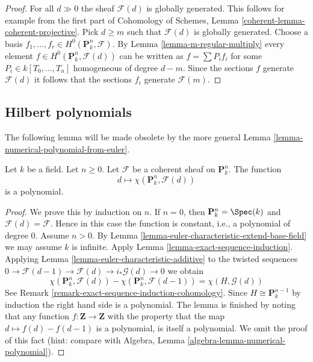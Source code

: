 \begin{proof}
For all $d \gg 0$ the sheaf $\mathcal{F}(d)$ is globally generated.
This follows for example from the first part of
Cohomology of Schemes, Lemma \ref{coherent-lemma-coherent-projective}.
Pick $d \geq m$ such that $\mathcal{F}(d)$ is globally generated.
Choose a basis $f_1, \ldots, f_r \in H^0(\mathbf{P}^n_k, \mathcal{F})$.
By Lemma \ref{lemma-m-regular-multiply} every element
$f \in H^0(\mathbf{P}^n_k, \mathcal{F}(d))$ can be written as
$f = \sum P_if_i$ for some $P_i \in k[T_0, \ldots, T_n]$ homogeneous
of degree $d - m$. Since the sections $f$ generate $\mathcal{F}(d)$
it follows that the sections $f_i$ generate $\mathcal{F}(m)$.
\end{proof}

\subsection{Hilbert polynomials}
\label{subsection-hilbert}

\noindent
The following lemma will be made obsolete by the more general
Lemma \ref{lemma-numerical-polynomial-from-euler}.

\begin{lemma}
\label{lemma-hilbert-polynomial}
Let $k$ be a field. Let $n \geq 0$. Let $\mathcal{F}$ be a coherent sheaf
on $\mathbf{P}^n_k$. The function
$$
d \longmapsto \chi(\mathbf{P}^n_k, \mathcal{F}(d))
$$
is a polynomial.
\end{lemma}

\begin{proof}
We prove this by induction on $n$. If $n = 0$, then
$\mathbf{P}^n_k = \Spec(k)$ and $\mathcal{F}(d) = \mathcal{F}$.
Hence in this case the function is constant, i.e., a polynomial
of degree $0$. Assume $n > 0$. By
Lemma \ref{lemma-euler-characteristic-extend-base-field}
we may assume $k$ is infinite. Apply
Lemma \ref{lemma-exact-sequence-induction}.
Applying Lemma \ref{lemma-euler-characteristic-additive}
to the twisted sequences
$0 \to \mathcal{F}(d - 1) \to \mathcal{F}(d) \to i_*\mathcal{G}(d) \to 0$
we obtain
$$
\chi(\mathbf{P}^n_k, \mathcal{F}(d)) -
\chi(\mathbf{P}^n_k, \mathcal{F}(d - 1)) =
\chi(H, \mathcal{G}(d))
$$
See Remark \ref{remark-exact-sequence-induction-cohomology}.
Since $H \cong \mathbf{P}^{n - 1}_k$
by induction the right hand side is a polynomial.
The lemma is finished by noting that any function
$f : \mathbf{Z} \to \mathbf{Z}$ with the property that the map
$d \mapsto f(d) - f(d - 1)$ is a polynomial, is itself a polynomial.
We omit the proof of this fact (hint: compare with
Algebra, Lemma \ref{algebra-lemma-numerical-polynomial}).
\end{proof}


